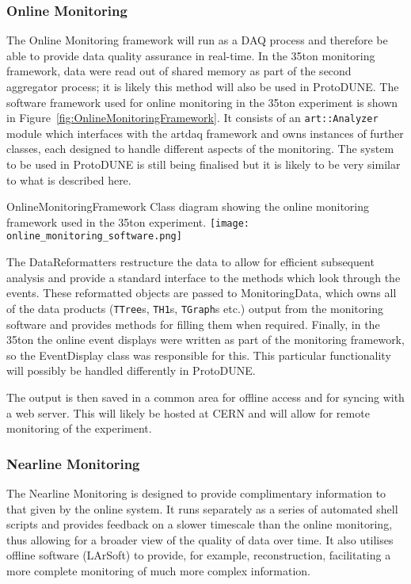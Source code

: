 \subsubsection{Online Monitoring}
The Online Monitoring framework will run as a DAQ process and therefore be
able to provide data quality assurance in real-time. In the 35ton monitoring
framework, data were read out of shared memory as part of the second
aggregator process; it is likely this method will also be used in ProtoDUNE.
The software framework used for online monitoring in the 35ton experiment is
shown in Figure~\ref{fig:OnlineMonitoringFramework}.  It consists of an
\texttt{art::Analyzer} module which interfaces with the artdaq framework and
owns instances of further classes, each designed to handle different aspects
of the monitoring.  The system to be used in ProtoDUNE is still being
finalised but it is likely to be very similar to what is described here.

\begin{cdrfigure}{OnlineMonitoringFramework}{
    Class diagram showing the online monitoring framework used in the 35ton
    experiment.}
  \texttt{[image: online\_monitoring\_software.png]}
\end{cdrfigure}

The DataReformatters restructure the data to allow for efficient subsequent
analysis and provide a standard interface to the methods which look through
the events.  These reformatted objects are passed to MonitoringData, which
owns all of the data products (\texttt{TTree}s, \texttt{TH1}s, \texttt{TGraph}s
etc.) output from the monitoring software and provides methods for filling
them when required.  Finally, in the 35ton the online event displays were
written as part of the monitoring framework, so the EventDisplay class was
responsible for this.  This particular functionality will possibly be handled
differently in ProtoDUNE.

The output is then saved in a common area for offline access and for syncing
with a web server. This will likely be hosted at CERN and will allow for remote
monitoring of the experiment.

\subsubsection{Nearline Monitoring}
The Nearline Monitoring is designed to provide complimentary information to
that given by the online system. It runs separately as a series of automated
shell scripts and provides feedback on a slower timescale than the online
monitoring, thus allowing for a broader view of the quality of data over time.
It also utilises offline software (LArSoft) to provide, for example,
reconstruction, facilitating a more complete monitoring of much more complex
information.

